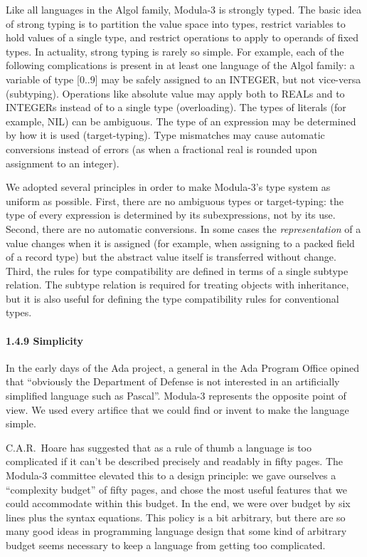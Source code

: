 \documentclass[10pt]{article}
\begin{document}
Like all languages in the Algol family, Modula-3 is strongly typed.  The basic
idea of strong typing is to partition the value space into types, restrict
variables to hold values of a single type, and restrict operations to apply to
operands of fixed types.  In actuality, strong typing is rarely so simple.
For example, each of the following complications is present in at least one
language of the Algol family: a variable of type [0..9] may be safely assigned
to an INTEGER, but not vice-versa (subtyping).  Operations like absolute value
may apply both to REALs and to INTEGERs instead of to a single type
(overloading).  The types of literals (for example, NIL) can be ambiguous.
The type of an expression may be determined by how it is used (target-typing).
Type mismatches may cause automatic conversions instead of errors (as when a
fractional real is rounded upon assignment to an integer).

We adopted several principles in order to make Modula-3's type system as
uniform as possible.  First, there are no ambiguous types or target-typing:
the type of every expression is determined by its subexpressions, not by its
use.  Second, there are no automatic conversions.  In some cases the
\emph{representation} of a value changes when it is assigned (for example,
when assigning to a packed field of a record type) but the abstract value
itself is transferred without change.  Third, the rules for type compatibility
are defined in terms of a single subtype relation.  The subtype relation is
required for treating objects with inheritance, but it is also useful for
defining the type compatibility rules for conventional types.

\paragraph{1.4.9 Simplicity}

In the early days of the Ada project, a general in the Ada Program Office
opined that ``obviously the Department of Defense is not interested in an
artificially simplified language such as Pascal''.  Modula-3 represents the
opposite point of view.  We used every artifice that we could find or invent
to make the language simple.

C.A.R.\ Hoare has suggested that as a rule of thumb a language is too
complicated if it can't be described precisely and readably in fifty pages.
The Modula-3 committee elevated this to a design principle: we gave ourselves
a ``complexity budget'' of fifty pages, and chose the most useful features
that we could accommodate within this budget.  In the end, we were over budget
by six lines plus the syntax equations.  This policy is a bit arbitrary, but
there are so many good ideas in programming language design that some kind of
arbitrary budget seems necessary to keep a language from getting too
complicated.
\end{document}

